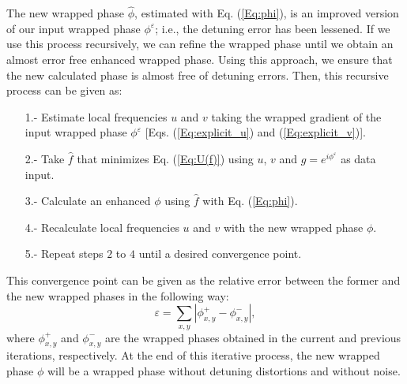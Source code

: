 The new wrapped phase $\hat \phi$, estimated with Eq. (\ref{Eq:phi}), is an 
improved version of our input wrapped phase $\phi^\varepsilon$; i.e., the 
detuning error has been lessened. If we use this process recursively, we can 
refine the wrapped phase until we obtain an almost error free enhanced wrapped 
phase. Using this approach, we ensure that the new calculated phase is almost 
free of detuning errors. Then, this recursive process can be given as: 
\begin{itemize}
\item[1.-] Estimate local frequencies $u$ and $v$ taking the wrapped
  gradient of the input wrapped phase $\phi^\varepsilon$
  [Eqs. (\ref{Eq:explicit_u}) and (\ref{Eq:explicit_v})].
\item[2.-] Take $\hat{f}$ that minimizes Eq. (\ref{Eq:U(f)}) using $u$, 
 $v$ and $g=e^{i \phi^\varepsilon}$ as data input.
\item[3.-] Calculate an enhanced $\phi$ using $\hat{f}$ with
  Eq. (\ref{Eq:phi}).
\item[4.-] Recalculate local frequencies $u$ and $v$ with the new
  wrapped phase $\phi$.
\item[5.-] Repeat steps $2$ to $4$ until a desired convergence point.
\end{itemize}

This convergence point can be given as the relative error between the 
former and the new wrapped phases in the following way:
\begin{equation}
	\varepsilon = \sum_{x,y} \left| \phi_{x,y}^{+} - \phi_{x,y}^{-} 
	\right|,
\end{equation}
where $\phi_{x,y}^{+}$ and $\phi_{x,y}^{-}$ are the wrapped phases obtained in 
the current and previous iterations, respectively. At the end of this 
iterative process, the new wrapped phase $\phi$ will be a wrapped phase without 
detuning distortions and without noise.


